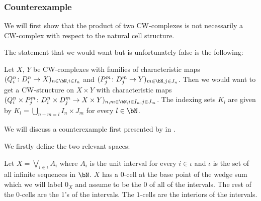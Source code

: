 \subsubsection*{Counterexample}

We will first show that the product of two CW-complexes is not necessarily a CW-complex with respect to the natural cell structure.

\begin{rem} \label{rem:wrongproduct}
    The statement that we would want but is unfortunately false is the following: 

    Let $X$, $Y$ be CW-complexes with families of characteristic maps $(Q_i^n \colon D_i^n \to X)_{n \in \bN, i \in I_n}$ and $(P_j^m \colon D_j^m \to Y)_{m \in \bN, j \in J_n}$. 
    Then we would want to get a CW-structure on $X \times Y$ with characteristic maps $(Q_i^n \times P_j^m \colon D_i^n \times D_j^m \to X \times Y)_{n,m \in \bN,i \in I_n,j \in J_m}$.
    The indexing sets $K_l$ are given by $K_l = \bigcup_{n + m = l}I_n \times J_m$ for every $l \in \bN$.
\end{rem}

We will discuss a counterexample first presented by  in \cite{Dowker1952}. 

We firstly define the two relevant spaces: 

\begin{defi}
    Let $X = \bigvee_{i \in \iota} A_i$ where $A_i$ is the unit interval for every $i \in \iota$ and $\iota$ is the set of all infinite sequences in $\bN$. 
    $X$ has a $0$-cell at the base point of the wedge sum which we will label $0_X$ and assume to be the $0$ of all of the intervals. The rest of the $0$-cells are the $1$'s of the intervals. 
    The $1$-cells are the interiors of the intervals. 
\end{defi}

